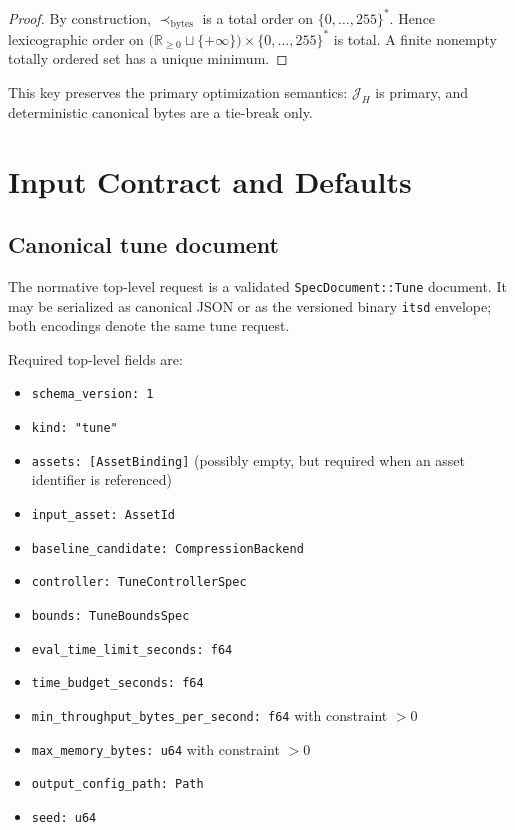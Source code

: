 \documentclass[11pt]{article}
\begin{document}
\begin{proof}
By construction, $\prec_{\mathrm{bytes}}$ is a total order on
$\{0,\dots,255\}^*$. Hence lexicographic order on
$\big(\mathbb{R}_{\ge 0}\sqcup\{+\infty\}\big)\times\{0,\dots,255\}^*$ is total. A finite
nonempty totally ordered set has a unique minimum.
\end{proof}

This key preserves the primary optimization semantics: $\mathcal{J}_H$ is
primary, and deterministic canonical bytes are a tie-break only.

\section{Input Contract and Defaults}\label{sec:input-contract}

\subsection{Canonical tune document}

The normative top-level request is a validated \texttt{SpecDocument::Tune}
document. It may be serialized as canonical JSON or as the versioned binary
\texttt{itsd} envelope; both encodings denote the same tune request.

Required top-level fields are:
\begin{itemize}
    \item \texttt{schema\_version: 1}
    \item \texttt{kind: "tune"}
    \item \texttt{assets: [AssetBinding]} (possibly empty, but required when
    an asset identifier is referenced)
    \item \texttt{input\_asset: AssetId}
    \item \texttt{baseline\_candidate: CompressionBackend}
    \item \texttt{controller: TuneControllerSpec}
    \item \texttt{bounds: TuneBoundsSpec}
    \item \texttt{eval\_time\_limit\_seconds: f64}
    \item \texttt{time\_budget\_seconds: f64}
    \item \texttt{min\_throughput\_bytes\_per\_second: f64} with constraint $>0$
    \item \texttt{max\_memory\_bytes: u64} with constraint $>0$
    \item \texttt{output\_config\_path: Path}
    \item \texttt{seed: u64}
\end{itemize}
\end{document}
